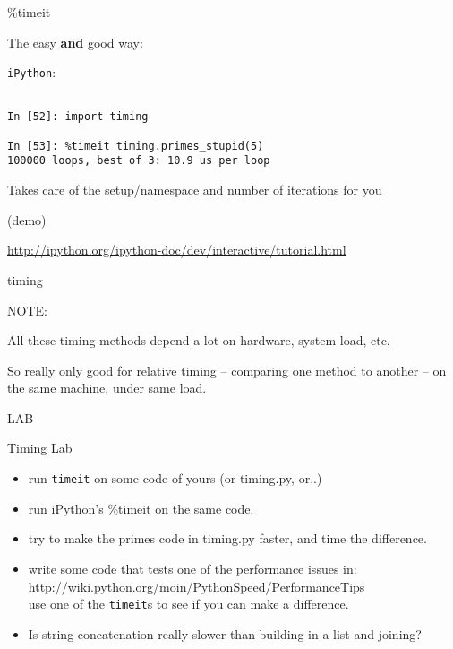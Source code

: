 \documentclass{beamer}
\begin{document}
\begin{frame}[fragile]{\%timeit}

{\Large The easy {\bf and} good way:}

\vfill
{\LARGE \verb|iPython|:}
\begin{verbatim}

In [52]: import timing

In [53]: %timeit timing.primes_stupid(5)
100000 loops, best of 3: 10.9 us per loop

\end{verbatim}

{\Large Takes care of the setup/namespace and number of iterations for you}

\vfill
(demo)

\vfill
\url{http://ipython.org/ipython-doc/dev/interactive/tutorial.html}
\end{frame} 


\begin{frame}[fragile]{timing}

{\LARGE NOTE:}

\vfill
{\Large All these timing methods depend a lot on hardware, system load, etc.}


\vfill
{\Large So really only good for relative timing -- comparing one method to another -- on the same machine, under same load.}

\end{frame}

\begin{frame}[fragile]{LAB}

{\Large Timing Lab}
\begin{itemize}
  \item run \verb|timeit| on some code of yours (or timing.py, or..)
  \item run iPython's \%timeit on the same code.
  \item try to make the primes code in timing.py faster, and time the difference.
  \item write some code that tests one of the performance issues in:\\
        {\small \url{http://wiki.python.org/moin/PythonSpeed/PerformanceTips} }\\
        use one of the \verb|timeit|s to see if you can make a difference.
  \item Is string concatenation really slower than building in a list and joining?
\end{itemize}

\end{frame}
\end{document}
